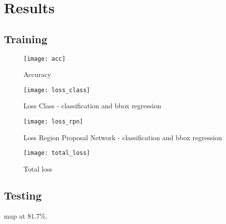 \graphicspath{{figures/results/}}
\chapter{Results}
%
\section{Training}

\begin{figure}[H]
	\centering
	\texttt{[image: acc]}
	\caption{Accuracy}
	\label{fig:}
\end{figure}
\begin{figure}[H]
	\centering
	\texttt{[image: loss\_class]}
	\caption{Loss Class - classification and bbox regression}
	\label{fig:}
\end{figure}
\begin{figure}[H]
	\centering
	\texttt{[image: loss\_rpn]}
	\caption{Loss Region Proposal Network - classification and bbox regression}
	\label{fig:}
\end{figure}
\begin{figure}[H]
	\centering
	\texttt{[image: total\_loss]}
	\caption{Total loss}
	\label{fig:}
\end{figure}

\section{Testing}
\gls{map} at $81.7\%$. 

%
